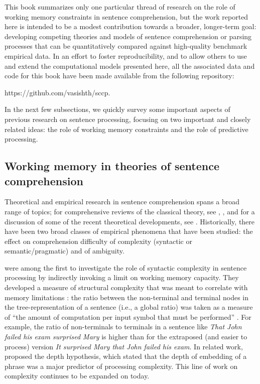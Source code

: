 \documentclass{cambridge7A}\usepackage[]{graphicx}\usepackage[]{color}
\begin{document}
This book summarizes only one particular thread of research on the role of  
working memory constraints in sentence comprehension, but the work
reported here is intended to be a modest contribution towards a
broader, longer-term goal: developing competing theories and models of sentence
comprehension or parsing processes that can be quantitatively compared
against high-quality benchmark empirical data.  In an effort to foster
reproducibility, and to allow others to use and extend the
computational models presented here, all the associated data and code
for this book have been made available from the following repository:

https://github.com/vasishth/sccp.

In the next few subsections, we quickly survey some important aspects of previous research on sentence processing, focusing on two important and closely related ideas: the role of working memory constraints and the role of predictive processing.

\subsection{Working memory in theories of sentence comprehension}


Theoretical and empirical research in sentence comprehension spans a
broad range of topics; for comprehensive reviews of the classical
theory, see \cite{Frazier1987}, \cite{PickeringVanGompel2006}, and for
a discussion of some of the recent theoretical developments, see
\cite{traxler2014trends}. Historically, there have been two broad
classes of empirical phenomena that have been studied: the effect on
comprehension difficulty of complexity (syntactic or
semantic/pragmatic) and of ambiguity.

\cite{MillerChomsky63} were among the first to investigate the role of 
syntactic complexity in sentence processing by indirectly invoking a
limit on working memory capacity. They developed a measure of 
structural complexity that was meant to correlate with memory
limitations \cite[480-482]{MillerChomsky63}: the ratio between the
non-terminal and terminal nodes in the tree-representation of a
sentence (i.e., a global ratio) was taken as a measure of ``the amount
of computation per input symbol that must be performed''
\cite[480]{MillerChomsky63}.  For example, the ratio of non-terminals
to terminals in a sentence like \textit{That John failed his exam
surprised Mary} is higher than for the extraposed (and easier
to process) version \textit{It surprised Mary that John failed his
exam}.  In related work, \cite{yngve} proposed the depth hypothesis, 
which stated that the depth of embedding of a phrase was a major
predictor of processing complexity. This line of work on complexity
continues to be expanded on today.
\end{document}
